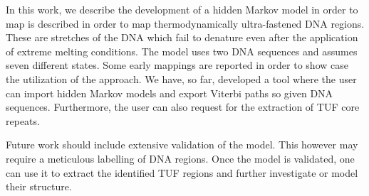 \documentclass[12pt]{article}
\let\tempone\itemize
\let\temptwo\enditemize
\let\tempthree\enumerate
\let\tempfour\endenumerate
\renewenvironment{itemize}{\tempone\setlength{\itemsep}{0pt}}{\temptwo}
\renewenvironment{enumerate}{\tempthree\setlength{\itemsep}{0pt}}{\tempfour}
\begin{document}
In this work, we describe the development of a hidden Markov model in order to map  is described in order to map thermodynamically ultra-fastened DNA regions. These  are stretches of the DNA which fail to denature even after the application of extreme melting conditions. The model uses two DNA sequences and assumes seven different states. Some early mappings are reported in order to show case the utilization of the approach. We have, so far, developed a tool where the user can import hidden Markov models and export Viterbi paths so given DNA sequences. Furthermore, the user can also request for the extraction of TUF core repeats. 

Future work should include extensive validation of the model. This however may require a meticulous labelling of DNA regions. Once the model is validated, one  can use it to extract the identified TUF regions and further investigate or model their structure. 


\clearpage







%
%


\end{document}
